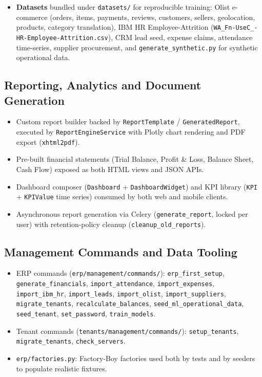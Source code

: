 \documentclass[12pt,a4paper]{report}
\begin{document}
\begin{itemize}
  \item \textbf{Datasets} bundled under \texttt{datasets/} for reproducible training: Olist e-commerce (orders, items, payments, reviews, customers, sellers, geolocation, products, category translation), IBM HR Employee-Attrition (\texttt{WA\_Fn-UseC\_-HR-Employee-Attrition.csv}), CRM lead seed, expense claims, attendance time-series, supplier procurement, and \texttt{generate\_synthetic.py} for synthetic operational data.
\end{itemize}

\subsection{Reporting, Analytics and Document Generation}
\begin{itemize}
  \item Custom report builder backed by \texttt{ReportTemplate} / \texttt{GeneratedReport}, executed by \texttt{ReportEngineService} with Plotly chart rendering and PDF export (\texttt{xhtml2pdf}).
  \item Pre-built financial statements (Trial Balance, Profit \& Loss, Balance Sheet, Cash Flow) exposed as both HTML views and JSON APIs.
  \item Dashboard composer (\texttt{Dashboard} + \texttt{DashboardWidget}) and KPI library (\texttt{KPI} + \texttt{KPIValue} time series) consumed by both web and mobile clients.
  \item Asynchronous report generation via Celery (\texttt{generate\_report}, locked per user) with retention-policy cleanup (\texttt{cleanup\_old\_reports}).
\end{itemize}

\subsection{Management Commands and Data Tooling}
\begin{itemize}
  \item ERP commands (\texttt{erp/management/commands/}): \texttt{erp\_first\_setup}, \texttt{generate\_financials}, \texttt{import\_attendance}, \texttt{import\_expenses}, \texttt{import\_ibm\_hr}, \texttt{import\_leads}, \texttt{import\_olist}, \texttt{import\_suppliers}, \texttt{migrate\_tenants}, \texttt{recalculate\_balances}, \texttt{seed\_ml\_operational\_data}, \texttt{seed\_tenant}, \texttt{set\_password}, \texttt{train\_models}.
  \item Tenant commands (\texttt{tenants/management/commands/}): \texttt{setup\_tenants}, \texttt{migrate\_tenants}, \texttt{check\_servers}.
  \item \texttt{erp/factories.py}: Factory-Boy factories used both by tests and by seeders to populate realistic fixtures.
\end{itemize}
\end{document}

